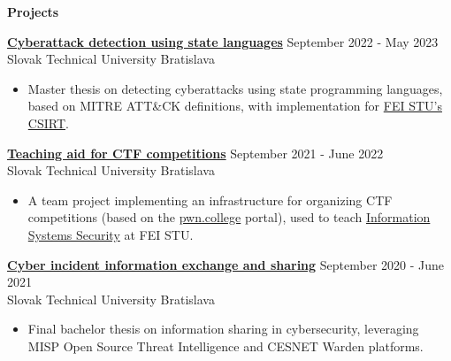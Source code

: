 \documentclass[12pt]{article}
\begin{document}


\vspace{0.2in} %

\begin{center}
	{\noindent \bfseries Projects}
\end{center}

\vspace{0.1pt}

\noindent
{\bfseries \href{https://opac.crzp.sk/?fn=detailBiblioFormChildU1JSMF&sid=C0DEB8E07572332BAD240C15805F&seo=CRZP-detail-kniha}{Cyberattack detection using state languages} } \hfill September 2022 - May 2023 \\[0.04in]
\noindent Slovak Technical University \hfill Bratislava 
\begin{itemize} \itemsep -2pt %
	\item Master thesis on detecting cyberattacks using state programming languages, based on MITRE ATT\&CK definitions, with implementation for \href{https://csirt.fei.stuba.sk}{FEI STU's CSIRT}.
\end{itemize}

\noindent
{\bfseries \href{https://github.com/feictf/tp_feictf}{Teaching aid for CTF competitions} } \hfill September 2021 - June 2022 \\[0.04in]
\noindent Slovak Technical University \hfill Bratislava 
\begin{itemize} \itemsep -2pt %
	\item A team project implementing an infrastructure for organizing CTF competitions (based on the \href{https://pwn.college/}{pwn.college} portal), used to teach \href{https://uim.fei.stuba.sk/predmet/i-bispp/}{Information Systems Security} at FEI STU.
\end{itemize}

\noindent
{\bfseries \href{https://opac.crzp.sk/?fn=DETAILBIBLIOFORMChildCB96V&sid=38F43C5054BC4F7F2DBBCFF31F28&seo=CRZP-detail-kniha}{Cyber incident information exchange and sharing} } \hfill September 2020 - June 2021 \\[0.04in]
\noindent Slovak Technical University \hfill Bratislava 
\begin{itemize} \itemsep -2pt %
	\item Final bachelor thesis on information sharing in cybersecurity, leveraging MISP Open Source Threat Intelligence and CESNET Warden platforms.
\end{itemize}
\end{document}

